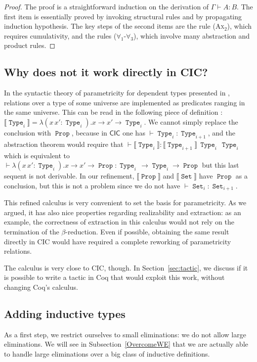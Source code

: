 \documentclass[a4paper,USenglish]{lipics}
\DeclareMathOperator{\Prop}{\mathtt{Prop}}
\DeclareMathOperator{\Type}{\mathtt{Type}}
\DeclareMathOperator{\Set}{\mathtt{Set}}
\def\coq{\textsf{Coq}\xspace}
\def\cic{\textsf{CIC}\xspace}
\begin{document}
\begin{proof}
  The proof is a straightforward
  induction
  on the derivation of $\Gamma \vdash A : B$. The first item is essentially
  proved by invoking structural rules and by propagating induction hypothesis.
  The key steps of the second items are the rule (\textsc{Ax$_2$}), which requires cumulativity, and
  the rules (\textsc{$\forall_1$}-\textsc{$\forall_3$}), which involve
  many abstraction and product rules.
\end{proof}


\subsection{\label{WhyDoesNotWork}Why does not it work directly in \cic ?}

In the syntactic theory of parametricity for dependent types presented in
\cite{DBLP:conf/icfp/BernardyJP10}, relations over a type of some universe
are implemented as predicates ranging in the same universe. This can be read
in the following piece of definition : $⟦\Type_i⟧ = λ(x\,x' : \Type_i).x → x' → \Type_i$. We cannot simply replace the conclusion with $\Prop$, because in
$\cic$ one has $⊢ \Type_i : \Type_{i+1}$, and the abstraction theorem
would require that $⊢ ⟦\Type_i⟧ : ⟦\Type_{i+1}⟧\,\Type_i\,\Type_{i}$
which is equivalent to
 $⊢  λ(x\,x' : \Type_i).x → x' → \Prop : \Type_i\, → \Type_{i} → \Prop$
but this last sequent is not derivable. In our refinement, $⟦\Prop⟧$ and $⟦\Set⟧$ have $\Prop$ as a conclusion,
but this is not a problem since we do not have $⊢ \Set_i : \Set_{i+1}$.

This refined calculus is very convenient to set the basis for
parametricity. As we argued, it has also nice properties regarding
realizability and extraction: as an example, the correctness of
extraction in this calculus would not rely on the termination of the $\beta$-reduction.
Even if possible, obtaining the same result directly in \cic would have
required a complete reworking of parametricity relations.

The calculus is very close to \cic, though. In Section~\ref{sec:tactic},
we discuss if it is possible to write a tactic in \coq that would
exploit this work, without changing \coq's calculus.


\subsection{Adding inductive types}

As a first step, we restrict ourselves to small eliminations: we do not
allow large eliminations. We will see in Subsection~\ref{OvercomeWE}
that we are actually able to handle large eliminations over a big
class of inductive definitions.
\end{document}
